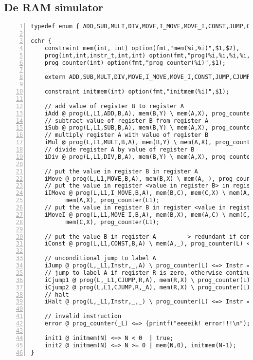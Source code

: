 \subsection{De RAM simulator} \label{sec:ram-cchr}

{\scriptsize
\begin{Verbatim}[frame=single,numbers=left]
typedef enum { ADD,SUB,MULT,DIV,MOVE,I_MOVE,MOVE_I,CONST,JUMP,CJUMP,HALT } instr_t;

cchr {
	constraint mem(int, int) option(fmt,"mem(%i,%i)",$1,$2), 
	prog(int,int,instr_t,int,int) option(fmt,"prog(%i,%i,%i,%i,%i)",$1,$2,$3,$4,$5),
	prog_counter(int) option(fmt,"prog_counter(%i)",$1);
	
	extern ADD,SUB,MULT,DIV,MOVE,I_MOVE,MOVE_I,CONST,JUMP,CJUMP,HALT;
		
	constraint initmem(int) option(fmt,"initmem(%i)",$1);
	
	// add value of register B to register A
	iAdd @ prog(L,L1,ADD,B,A), mem(B,Y) \ mem(A,X), prog_counter(L) <=> mem(A,X+Y), prog_counter(L1);
	// subtract value of register B from register A
	iSub @ prog(L,L1,SUB,B,A), mem(B,Y) \ mem(A,X), prog_counter(L) <=> mem(A,X-Y), prog_counter(L1);
	// multiply register A with value of register B
	iMul @ prog(L,L1,MULT,B,A), mem(B,Y) \ mem(A,X), prog_counter(L) <=> mem(A,X*Y), prog_counter(L1);
	// divide register A by value of register B
	iDiv @ prog(L,L1,DIV,B,A), mem(B,Y) \ mem(A,X), prog_counter(L) <=> mem(A,X/Y), prog_counter(L1);

	// put the value in register B in register A
	iMove @ prog(L,L1,MOVE,B,A), mem(B,X) \ mem(A,_), prog_counter(L) <=> mem(A,X), prog_counter(L1);
	// put the value in register <value in register B> in register A
	iIMove @ prog(L,L1,I_MOVE,B,A), mem(B,C), mem(C,X) \ mem(A,_), prog_counter(L) <=> 
          mem(A,X), prog_counter(L1);
	// put the value in register B in register <value in register A>
	iMoveI @ prog(L,L1,MOVE_I,B,A), mem(B,X), mem(A,C) \ mem(C,_), prog_counter(L) <=> 
          mem(C,X), prog_counter(L1);

	// put the value B in register A        -> redundant if consts are in init mem
	iConst @ prog(L,L1,CONST,B,A) \ mem(A,_), prog_counter(L) <=> mem(A,B), prog_counter(L1);

	// unconditional jump to label A
	iJump @ prog(L,_L1,Instr,_,A) \ prog_counter(L) <=> Instr == JUMP | prog_counter(A);
	// jump to label A if register R is zero, otherwise continue
	iCjump1 @ prog(L,_L1,CJUMP,R,A), mem(R,X) \ prog_counter(L) <=> X == 0 | prog_counter(A);
	iCjump2 @ prog(L,L1,CJUMP,R,_A), mem(R,X) \ prog_counter(L) <=> X != 0 | prog_counter(L1);
	// halt
	iHalt @ prog(L,_L1,Instr,_,_) \ prog_counter(L) <=> Instr == HALT | true;

	// invalid instruction
	error @ prog_counter(_L) <=> {printf("eeeeik! error!!!\n");};
		
	init1 @ initmem(N) <=> N < 0  | true;
	init2 @ initmem(N) <=> N >= 0 | mem(N,0), initmem(N-1);
}
\end{Verbatim}
}
